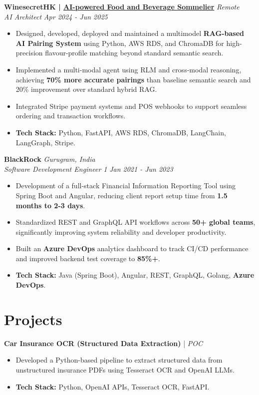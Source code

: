 \documentclass[9pt,a4paper]{extarticle}
\newcommand{\resumeItem}[1]{\item\small{#1}}
\newcommand{\resumeHeading}[4]{
  \vspace{3pt}
  \textbf{#1} \hfill \textit{#2} \\[2pt]
  \textit{#3} \hfill \textit{#4} \\[1pt]
}
\begin{document}
\resumeHeading{WinesecretHK \textnormal{| \href{https://rag.winesecrethk.com/static/index.html?client=rizzy\&role=reseller}{AI-powered Food and Beverage Sommelier}}}{Remote}{AI Architect}{Apr 2024 - Jun 2025}
\begin{itemize}[leftmargin=*, nosep]
    \resumeItem{Designed, developed, deployed and maintained a multimodel \textbf{RAG-based AI Pairing System} using Python, AWS RDS, and ChromaDB for high-precision flavour-profile matching beyond standard semantic search.}
    \resumeItem{Implemented a multi-modal agent using RLM  and cross-modal reasoning, achieving \textbf{70\% more accurate pairings} than baseline semantic search and 20\% improvement over standard hybrid RAG.}
    \resumeItem{Integrated Stripe payment systems and POS webhooks to support seamless ordering and transaction workflows.}
    \resumeItem{\textbf{Tech Stack:} Python, FastAPI, AWS RDS, ChromaDB, LangChain, LangGraph, Stripe.}
\end{itemize}

\resumeHeading{BlackRock}{Gurugram, India}{Software Development Engineer 1}{Jan 2021 - Jun 2023}
\begin{itemize}[leftmargin=*, nosep]
    \resumeItem{Development of a full-stack Financial Information Reporting Tool using Spring Boot and Angular, reducing client report setup time from \textbf{1.5 months to 2-3 days}.}
    \resumeItem{Standardized REST and GraphQL API workflows across \textbf{50+ global teams}, significantly improving system reliability and developer productivity.}
    \resumeItem{Built an \textbf{Azure DevOps} analytics dashboard to track CI/CD performance and improved backend test coverage to \textbf{85\%+}.}
    \resumeItem{\textbf{Tech Stack:} Java (Spring Boot), Angular, REST, GraphQL, Golang, \textbf{Azure DevOps}.}
\end{itemize}

\section{Projects}

\textbf{Car Insurance OCR (Structured Data Extraction)} | \hfill \textit{POC}
\begin{itemize}[leftmargin=*, nosep]
    \resumeItem{Developed a Python-based pipeline to extract structured data from unstructured insurance PDFs using Tesseract OCR and OpenAI LLMs.}
    \resumeItem{\textbf{Tech Stack:} Python, OpenAI APIs, Tesseract OCR, FastAPI.}
\end{itemize}
\end{document}
